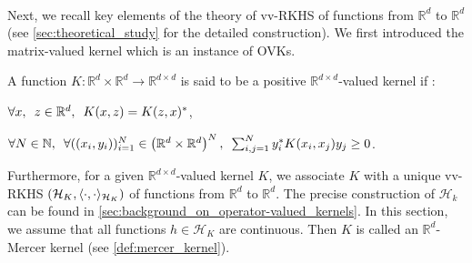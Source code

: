 \paragraph{}
Next, we recall key elements of the theory of \ac{vv-RKHS} of functions from
$\mathbb{R}^d$ to $\mathbb{R}^d$ (see \cref{sec:theoretical_study} for the
detailed construction). We first introduced the matrix-valued kernel which
is an instance of \acsp{OVK}.
\begin{definition}  A function
    $K:\mathbb{R}^d\times\mathbb{R}^d\to\mathbb{R}^{d\times d}$ is said to be a
    positive $\mathbb{R}^{d\times d}$-valued kernel  if :
    \begin{propenum}
        \item $\forall x,\enskip z \in\mathbb{R}^d,\enskip K(x, z)= K(z,
        x)^*$, \item $\forall N \in \mathbb{N},\enskip \forall ((x_i,
        y_i))_{i=1}^N\in\left(\mathbb{R}^d\times\mathbb{R}^d\right)^N,\enskip
        \sum_{i,j=1}^N y_i^* K(x_i, x_j)y_j \geq  0$.
    \end{propenum}
\end{definition}
Furthermore, for a given $\mathbb{R}^{d\times d}$-valued kernel $K$, we
associate $K$ with a unique \acs{vv-RKHS}
$(\mathcal{H}_K,\langle\cdot,\cdot\rangle_{\mathcal{H}_K})$ of functions from
$\mathbb{R}^d$ to $\mathbb{R}^d$. The precise construction of $\mathcal{H}_k$
can be found in \cref{sec:background_on_operator-valued_kernels}. In this
section, we assume that all functions $h\in\mathcal{H}_K$ are continuous. Then
$K$ is called an $\mathbb{R}^d$-Mercer kernel (see \cref{def:mercer_kernel}).
